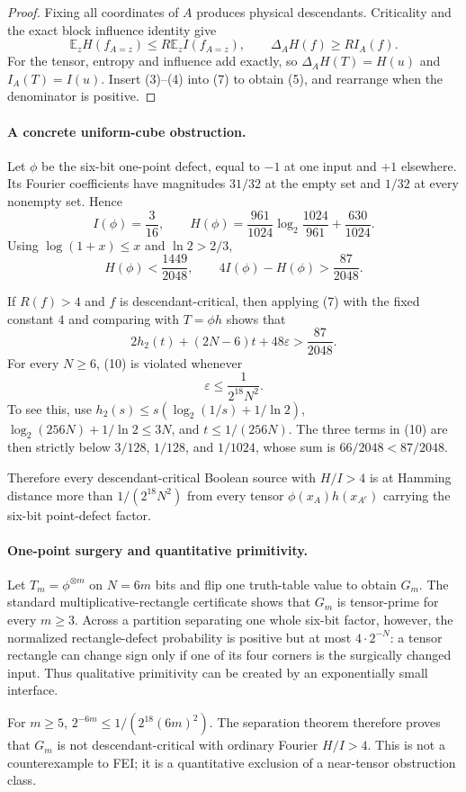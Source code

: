 \begin{proof}
Fixing all coordinates of $A$ produces physical descendants.  Criticality and
the exact block influence identity give
\[
 \mathbb E_zH(f_{A=z})\le R\mathbb E_zI(f_{A=z}),
 \qquad
 \Delta_AH(f)\ge RI_A(f).                              \tag{7}
\]
For the tensor, entropy and influence add exactly, so
$\Delta_AH(T)=H(u)$ and $I_A(T)=I(u)$.  Insert (3)--(4) into (7) to obtain
(5), and rearrange when the denominator is positive.
\end{proof}

\paragraph{A concrete uniform-cube obstruction.}
Let $\phi$ be the six-bit one-point defect, equal to $-1$ at one input and
$+1$ elsewhere.  Its Fourier coefficients have magnitudes $31/32$ at the
empty set and $1/32$ at every nonempty set.  Hence
\[
 I(\phi)=\frac3{16},\qquad
 H(\phi)=\frac{961}{1024}\log_2\frac{1024}{961}
          +\frac{630}{1024}.                            \tag{8}
\]
Using $\log(1+x)\le x$ and $\ln2>2/3$,
\[
 H(\phi)<\frac{1449}{2048},
 \qquad 4I(\phi)-H(\phi)>\frac{87}{2048}.             \tag{9}
\]

If $R(f)>4$ and $f$ is descendant-critical, then applying (7) with the fixed
constant $4$ and comparing with $T=\phi h$ shows that
\[
 2h_2(t)+(2N-6)t+48\varepsilon>\frac{87}{2048}.        \tag{10}
\]
For every $N\ge6$, (10) is violated whenever
\[
 \varepsilon\le\frac1{2^{18}N^2}.                     \tag{11}
\]
To see this, use
$h_2(s)\le s(\log_2(1/s)+1/\ln2)$,
$\log_2(256N)+1/\ln2\le3N$, and $t\le1/(256N)$.
The three terms in (10) are then strictly below
$3/128$, $1/128$, and $1/1024$, whose sum is
$66/2048<87/2048$.

Therefore every descendant-critical Boolean source with $H/I>4$ is at
Hamming distance more than $1/(2^{18}N^2)$ from every tensor
$\phi(x_A)h(x_{A^c})$ carrying the six-bit point-defect factor.

\paragraph{One-point surgery and quantitative primitivity.}
Let $T_m=\phi^{\otimes m}$ on $N=6m$ bits and flip one truth-table value to
obtain $G_m$.  The standard multiplicative-rectangle certificate shows that
$G_m$ is tensor-prime for every $m\ge3$.  Across a partition separating one
whole six-bit factor, however, the normalized rectangle-defect probability is
positive but at most $4\cdot2^{-N}$: a tensor rectangle can change sign only
if one of its four corners is the surgically changed input.  Thus qualitative
primitivity can be created by an exponentially small interface.

For $m\ge5$, $2^{-6m}\le1/(2^{18}(6m)^2)$.  The separation theorem therefore
proves that $G_m$ is not descendant-critical with ordinary Fourier
$H/I>4$.  This is not a counterexample to FEI; it is a quantitative exclusion
of a near-tensor obstruction class.


